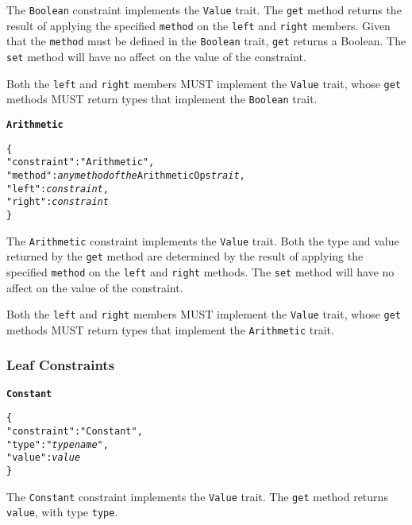 \documentclass[10pt,twocolumn,a4paper]{article}
\newcommand{\code}[1]{\texttt{#1}}
\begin{document}
The \code{Boolean} constraint implements the \code{Value} trait. The \code{get} method
returns the result of applying the specified \code{method} on the \code{left} and
\code{right} members. Given that the \code{method} must be defined in the \code{Boolean}
trait, \code{get} returns a Boolean. The \code{set} method will have no affect on the
value of the constraint.

Both the \code{left} and \code{right} members MUST implement the \code{Value} trait, whose
\code{get} methods MUST return types that implement the \code{Boolean} trait.

\textbf{\texttt{Arithmetic}}

\footnotesize
\begin{alltt}
  \{
    "constraint"   : "Arithmetic",
    "method"       : \emph{any method of the} ArithmeticOps \emph{trait},
    "left"         : \emph{constraint},
    "right"        : \emph{constraint}
  \}
\end{alltt}
\normalsize

The \code{Arithmetic} constraint implements the \code{Value} trait. Both the type and
value returned by the \code{get} method are determined by the result of applying the
specified \code{method} on the \code{left} and \code{right} methods. The \code{set} method
will have no affect on the value of the constraint.

Both the \code{left} and \code{right} members MUST implement the \code{Value} trait, whose
\code{get} methods MUST return types that implement the \code{Arithmetic} trait.

\subsubsection{Leaf Constraints}

\textbf{\texttt{Constant}}

\footnotesize
\begin{alltt}
  \{
    "constraint"   : "Constant",
    "type"         : "\emph{type name}",
    "value"        : \emph{value}
  \}
\end{alltt}
\normalsize

The \code{Constant} constraint implements the \code{Value} trait. The \code{get} method
returns \code{value}, with type \code{type}.
\end{document}
